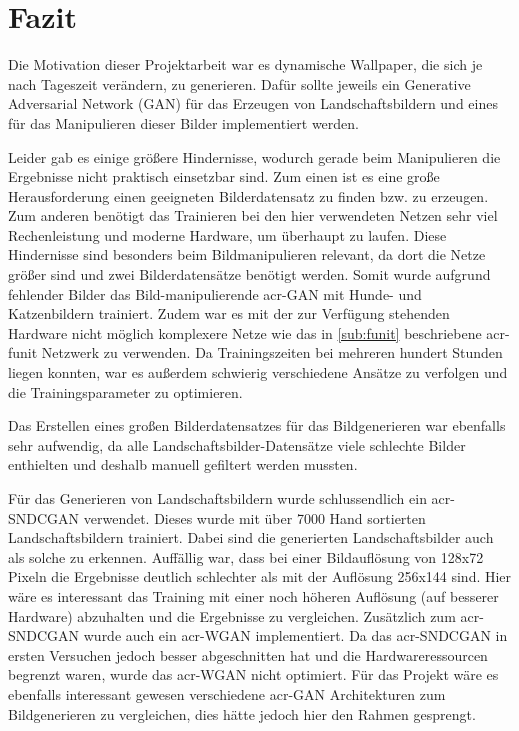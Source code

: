 \chapter{Fazit}\label{chp:fazit} %
\glsresetall

Die Motivation dieser Projektarbeit war es dynamische Wallpaper, die sich je nach 
Tageszeit verändern, zu generieren. Dafür sollte jeweils ein Generative Adversarial Network (GAN) für das 
Erzeugen von Landschaftsbildern und eines für das Manipulieren dieser Bilder 
implementiert werden. 

Leider gab es einige größere Hindernisse, wodurch gerade beim 
Manipulieren die Ergebnisse nicht praktisch einsetzbar sind. Zum einen ist es eine große 
Herausforderung einen geeigneten Bilderdatensatz zu finden bzw. zu erzeugen. Zum 
anderen benötigt das Trainieren bei den hier verwendeten Netzen sehr viel Rechenleistung 
und moderne Hardware, um überhaupt zu laufen. Diese Hindernisse sind besonders beim 
Bildmanipulieren relevant, da dort die Netze größer sind und zwei Bilderdatensätze 
benötigt werden. Somit wurde aufgrund fehlender Bilder das Bild-manipulierende 
\gls{acr-GAN} mit Hunde- und Katzenbildern trainiert. Zudem war es mit der zur Verfügung 
stehenden Hardware nicht möglich komplexere Netze wie das in \cref{sub:funit} 
beschriebene \gls{acr-funit} Netzwerk zu verwenden. Da Trainingszeiten bei mehreren 
hundert Stunden liegen konnten, war es außerdem schwierig verschiedene Ansätze zu 
verfolgen und die Trainingsparameter zu optimieren. 

Das Erstellen eines großen Bilderdatensatzes für das Bildgenerieren war ebenfalls sehr 
aufwendig, da alle Landschaftsbilder-Datensätze viele schlechte Bilder enthielten und 
deshalb manuell gefiltert werden mussten. 

Für das Generieren von Landschaftsbildern wurde schlussendlich ein \gls{acr-SNDCGAN} 
verwendet. Dieses wurde mit über 7000 Hand sortierten Landschaftsbildern trainiert. 
Dabei sind die generierten Landschaftsbilder auch als solche zu erkennen. Auffällig war, 
dass bei einer Bildauflösung von 128x72 Pixeln die Ergebnisse deutlich schlechter als 
mit der Auflösung 256x144 sind. Hier wäre es interessant das Training mit einer noch 
höheren Auflösung (auf besserer Hardware) abzuhalten und die Ergebnisse zu vergleichen. 
Zusätzlich zum  \gls{acr-SNDCGAN}  wurde auch ein \gls{acr-WGAN} implementiert. Da 
das \gls{acr-SNDCGAN} in ersten Versuchen jedoch besser abgeschnitten hat und die 
Hardwareressourcen begrenzt waren, wurde das \gls{acr-WGAN} nicht optimiert. Für das 
Projekt wäre es ebenfalls interessant gewesen verschiedene \gls{acr-GAN} Architekturen 
zum Bildgenerieren zu vergleichen, dies hätte jedoch hier den Rahmen gesprengt.

